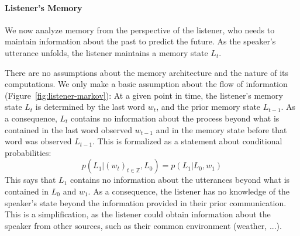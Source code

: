 \paragraph{Listener's Memory}
We now analyze memory from the perspective of the listener, who needs to maintain information about the past to predict the future.
As the speaker's utterance unfolds, the listener maintains a memory state $L_t$.



There are no assumptions about the memory architecture and the nature of its computations.
We only make a basic assumption about the flow of information (Figure~\ref{fig:listener-markov}):
At a given point in time, the listener's memory state $L_t$ is determined by the last word $w_t$, and the prior memory state $L_{t-1}$.
As a consequence, $L_t$ contains no information about the process beyond what is contained in the last word observed $w_{t-1}$ and in the memory state before that word was observed $L_{t-1}$.
This is formalized as a statement about conditional probabilities:
	\begin{equation}\label{eq:listener-markov}
		p(L_1| (w_{t})_{t \in \mathbb{Z}}, L_0)   = p(L_1 | L_0, w_1)
	\end{equation}
This says that $L_1$ contains no information about the utterances beyond what is contained in $L_0$ and $w_1$.	
As a consequence, the listener has no knowledge of the speaker's state beyond the information provided in their prior communication.
This is a simplification, as the listener could obtain information about the speaker from other sources, such as their common environment (weather, ...).

%
%

